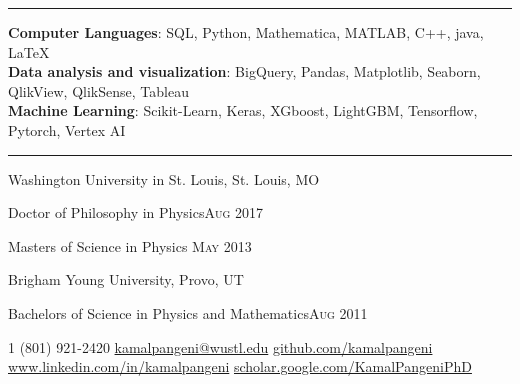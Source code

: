 \documentclass[10pt,letterpaper]{article}
\begin{document}
\vspace{-2ex}

\hrule
\vspace{1ex}
\textbf{Computer Languages}: SQL, Python, Mathematica, MATLAB, C++, java, \LaTeX \\
\textbf{Data analysis and visualization}: BigQuery, Pandas, Matplotlib, Seaborn, QlikView, QlikSense, Tableau\\
\textbf{ Machine Learning}: Scikit-Learn, Keras, XGboost, LightGBM, Tensorflow, Pytorch, Vertex AI\\




\vspace{-2ex}

\hrule
\vspace{1ex}
\headedsection
{Washington University in St. Louis, St. Louis, MO}
{} {

\headedsubsection
{Doctor of Philosophy in Physics}{\textsc{Aug 2017}}
{}
{}

\headedsubsection
{Masters of Science in Physics }{\textsc{May 2013}}
{}{}}


\headedsection
{Brigham Young University, Provo, UT}
{} {

\headedsubsection
{Bachelors of Science in Physics and Mathematics}{\textsc{Aug 2011}}
{}
{\bodytext{}}
}

\newpage
{}

\noindent\textsmaller{+}1 (801) 921-2420\bull
\href{mailto:kamalpangeni@wustl.edu}{kamalpangeni@wustl.edu}\bull
\href{https://github.com/kamalpangeni}
{github.com/kamalpangeni}\\
\href{https://www.linkedin.com/in/kamal-pangeni-31242a29/}
{www.linkedin.com/in/kamalpangeni}\bull
\href{https://scholar.google.com/citations?user=MJPS73gAAAAJ&hl=en}
{scholar.google.com/\textsmaller{+}KamalPangeniPhD}
\end{document}
